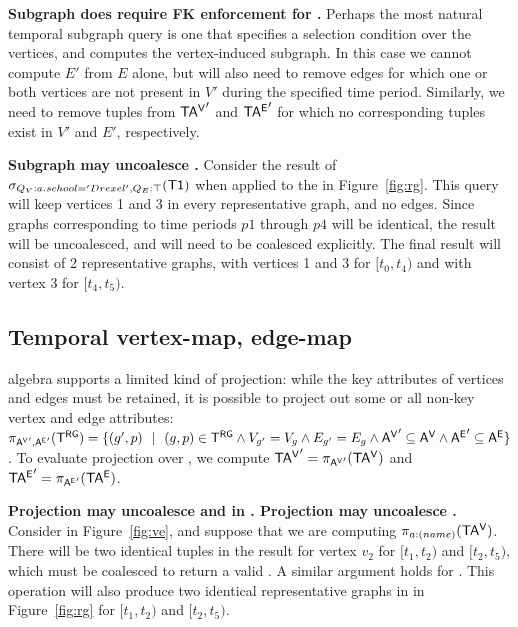 {\bf Subgraph does require FK enforcement for \tve.}  Perhaps the most
natural temporal subgraph query is one that specifies a selection
condition over the vertices, and computes the vertex-induced subgraph.
In this case we cannot compute $E'$ from $E$ alone, but will also need
to remove edges for which one or both vertices are not present in $V'$
during the specified time period.  Similarly, we need to remove tuples
from $\mathsf{TA^{V}}'$ and $\mathsf{TA^{E}}'$ for which no corresponding tuples exist in
$V'$ and $E'$, respectively.

{\bf Subgraph may uncoalesce \trg.} Consider the result of
$\sigma_{Q_V:{a.school='Drexel'},Q_E:\top} (\textsf{T1})$ when
applied to the \tg in Figure~\ref{fig:rg}.  This query will keep
vertices 1 and 3 in every representative graph, and no edges.  Since
graphs corresponding to time periods $p1$ through $p4$ will be
identical, the result will be uncoalesced, and will need to be
coalesced explicitly.  The final result will consist of 2
representative graphs, with vertices 1 and 3 for $[t_0, t_4)$ and with
  vertex 3 for $[t_4, t_5)$.


\subsection{Temporal vertex-map, edge-map}
\label{sec:algebra:map}

\tg algebra supports a limited kind of projection: while the key
attributes of vertices and edges must be retained, it is possible to
project out some or all non-key vertex and edge attributes:
$\pi_{\mathsf{A^{V}}',\mathsf{A^{E}}'} (\mathsf{T^{RG}}) = \{ (g', p)~~|~~(g, p) \in \mathsf{T^{RG}} \wedge
V_{g'} = V_{g} \wedge E_{g'} = E_{g} \wedge \mathsf{A^{V}}' \subseteq \mathsf{A^{V}}
\wedge \mathsf{A^{E}}' \subseteq \mathsf{A^{E}} \}$.  To evaluate projection over \tve, we
compute $\mathsf{TA^{V}}' = \pi_{\mathsf{A^{V}}'} (\mathsf{TA^{V}})$ and $\mathsf{TA^{E}}' = \pi_{\mathsf{A^{E}}'} (\mathsf{TA^{E}})$.

{\bf Projection may uncoalesce \tav and \tae in \tve.  Projection may
  uncoalesce \trg.} Consider  in Figure~\ref{fig:ve}, and
suppose that we are computing $\pi_{a:(name)} (\mathsf{TA^{V}})$.  There will be
two identical tuples in the result for vertex $v_2$ for $[t_1, t_2)$
  and $[t_2, t_5)$, which must be coalesced to return a valid \tav.  A
    similar argument holds for \tae. This operation will also produce
    two identical representative graphs in \trg in Figure~\ref{fig:rg}
    for $[t_1, t_2)$ and $[t_2, t_5)$.

